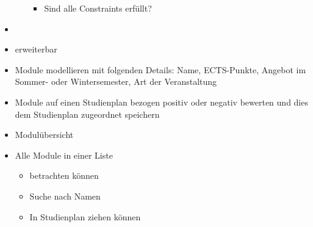 \begin{itemize}[nosep]
\begin{itemize}[nosep]
\begin{itemize}[nosep]
			\item Sind alle Constraints erfüllt?
		\end{itemize}
	\end{itemize}
	\item {}
	\item {} erweiterbar
	\item Module modellieren mit folgenden Details: Name, ECTS-Punkte, Angebot im Sommer- oder Wintersemester, Art der Veranstaltung
	\item Module auf einen Studienplan bezogen positiv oder negativ bewerten und dies dem Studienplan zugeordnet speichern
	\item Modulübersicht
		\item Alle Module in einer Liste
			\begin{itemize}[nosep]
				\item betrachten können
				\item Suche nach Namen
				\item In Studienplan ziehen können
			\end{itemize}
\end{itemize}

